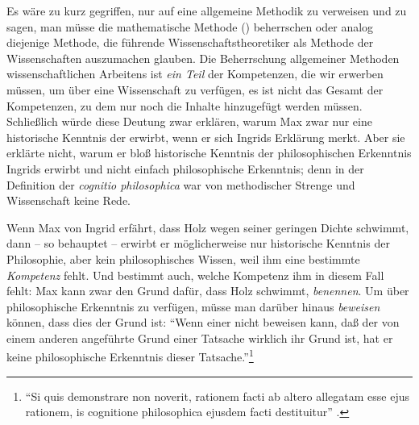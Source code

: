 Es wäre zu kurz gegriffen, nur auf eine allgemeine Methodik zu verweisen und zu
sagen, man müsse die mathematische Methode
()
beherrschen oder analog diejenige Methode, die führende
Wissenschaftstheoretiker als  Methode der Wissenschaften
auszumachen glauben. Die Beherrschung allgemeiner Methoden wissenschaftlichen
Arbeitens ist \emph{ein Teil} der Kompetenzen, die wir erwerben müssen, um über
eine Wissenschaft zu verfügen, es ist nicht das Gesamt der Kompetenzen, zu dem
nur noch die Inhalte hinzugefügt werden müssen. Schließlich würde diese Deutung
zwar erklären, warum Max zwar nur eine historische Kenntnis der
 erwirbt, wenn er sich Ingrids Erklärung merkt. Aber
sie erklärte nicht, warum er bloß historische Kenntnis der philosophischen
Erkenntnis Ingrids erwirbt und nicht einfach philosophische Erkenntnis; denn in
der Definition der \emph{cognitio philosophica} war von methodischer Strenge und
Wissenschaft keine Rede.

Wenn Max von Ingrid erfährt, dass Holz wegen seiner geringen Dichte schwimmt,
dann -- so behauptet
 -- erwirbt er
möglicherweise nur historische Kenntnis der Philosophie, aber kein
philosophisches Wissen, weil ihm eine bestimmte \emph{Kompetenz} fehlt. Und
 bestimmt
auch, welche Kompetenz ihm in diesem Fall fehlt: Max kann zwar den Grund dafür,
dass Holz schwimmt, \emph{benennen}. Um über philosophische Erkenntnis zu
verfügen, müsse man darüber hinaus \emph{beweisen} können, dass dies der Grund
ist: \enquote{{Wenn einer nicht beweisen kann, daß der von einem anderen
angeführte Grund einer Tatsache wirklich ihr Grund ist, hat er keine
philosophische Erkenntnis dieser
Tatsache.}}\footnote{\enquote{{Si quis demonstrare non noverit, rationem facti ab altero
allegatam esse ejus rationem, is cognitione philosophica ejusdem facti
destituitur}} \parencite[][\S~9,
\ohio]{Wolff:Discursuspraeliminarisdephilosophiaingenere1996}.}


